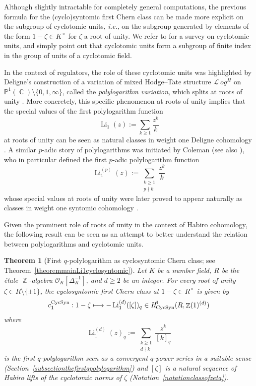 \documentclass[10pt,twoside]{scrarticle}
\newlength{\len}
\newlength{\temp}\setlength{\temp}{\paperwidth}
\newtheorem{theoremintro}{Theorem}
\theoremstyle{definition}
\DeclareMathOperator{\Z}{\mathbb{Z}}
\DeclareMathOperator{\C}{\mathbb{C}}
\newcommand{\Li}{\operatorname{Li}}
\newcommand{\nbrrg}{\mathcal{O}_K[\Delta_K^{-1}]}
\newcommand{\CycSyn}{\mathrm{CycSyn}}
\renewcommand{\ge}{\geqslant}
\numberwithin{equation}{theorem}
\begin{document}
    Although slightly intractable for completely general computations, the previous formula for the (cyclo)syntomic first Chern class can be made more explicit on the subgroup of cyclotomic units, \emph{i.e.}, on the subgroup generated by elements of the form $1-\zeta \in K^\times$ for $\zeta$ a root of unity. We refer to \cite[Chapter~8]{washington_1997} for a survey on cyclotomic units, and simply point out that cyclotomic units form a subgroup of finite index in the group of units of a cyclotomic field. 
    
    In the context of regulators, the role of these cyclotomic units was highlighted by Deligne's construction of a variation of mixed Hodge--Tate structure $\mathcal{L}\!\!\!\>\mathit{og}^H$ on $\mathbb{P}^1(\C)\setminus\{0,1,\infty\}$, called the \emph{\hbox{polylogarithm} variation}, which splits at roots of unity \cite{deligne_groupe_1989}. More concretely, this specific phenomenon at roots of unity implies that the special values of the first polylogarithm function
    $$\Li_1(z) := \sum_{k \ge 1} \frac{z^k}{k}$$
    at roots of unity can be seen as natural classes in weight one Deligne cohomology \cite{beilinson_interpretation_1994,huber_classical_1998}. A similar $p$-adic story of polylogarithms was initiated by Coleman \cite{coleman_dilogarithms_1982} (see also \cite[3.2]{deligne_groupe_1989}), who in particular defined the first $p$-adic polylogarithm function
    $$\Li_1^{(p)}(z) := \sum_{\substack{k \ge 1 \\ p \nmid k}} \frac{z^k}{k}$$
    whose special values at roots of unity were later proved to appear naturally as classes in weight one syntomic cohomology \cite{gros_regulateurs_1990}. 

    Given the prominent role of roots of unity in the context of Habiro cohomology, the following result can be seen as an attempt to better understand the relation between polylogarithms and cyclotomic units.
    
    \begin{theoremintro}[First $q$-polylogarithm as cyclosyntomic Chern class; see Theorem~\ref{theoremmainLi1cyclosyntomic}]\label{theoremintrofirstpolylogarithm}
        Let $K$ be a number field, $R$ be the étale $\Z$-algebra $\nbrrg$, and $d \ge 2$ be an integer. For every root of unity $\zeta \in R \setminus \{\pm 1\}$, the cyclosyntomic first Chern class at $1-\zeta \in R^\times$ is given by
        $$c_1^{\CycSyn} : 1 - \zeta \longmapsto - \Li_1^{(d)}([\zeta])_q \in \emph{H}^1_{\CycSyn}(R,\Z(1)^{(d)})$$
        where
        $$\Li_1^{(d)}(z)_q := \sum_{\substack{k \ge 1 \\ d \nmid k}} \frac{z^k}{[k]_q}$$
        is the first $q$-polylogarithm seen as a convergent $q$-power series in a suitable sense (Section~\ref{subsectionthefirstqpolylogarithm}) and $[\zeta]$ is a natural sequence of Habiro lifts of the cyclotomic norms of $\zeta$ (Notation~\ref{notationclassofzeta}). 
    \end{theoremintro}
\end{document}
